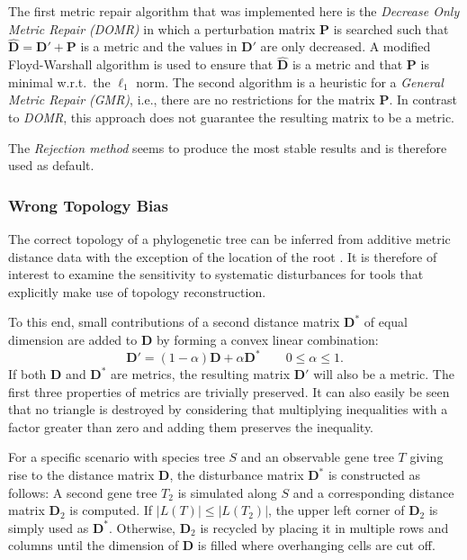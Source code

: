 \documentclass[hidelinks,11pt]{scrreprt}
\begin{document}
The first metric repair algorithm that was implemented here is the \textit{Decrease Only Metric Repair (DOMR)} in which a perturbation matrix $\mathbf{P}$ is searched such that $\mathbf{\hat{D}}=\mathbf{D'}+\mathbf{P}$ is a metric and the values in $\mathbf{D'}$ are only decreased. A modified Floyd-Warshall algorithm is used to ensure that $\mathbf{\hat{D}}$ is a metric and that $\mathbf{P}$ is minimal w.r.t.\ the $\ell_1$ norm. The second algorithm is a heuristic for a \textit{General Metric Repair (GMR)}, i.e., there are no restrictions for the matrix $\mathbf{P}$. In contrast to \emph{DOMR}, this approach does not guarantee the resulting matrix to be a metric.

The \textit{Rejection method} seems to produce the most stable results and is therefore used as default.

\subsubsection{Wrong Topology Bias}
\label{sec:wrong_topology_noise}

The correct topology of a phylogenetic tree can be inferred from additive metric distance data with the exception of the location of the root \citep[][]{bandelt1986,saitou1987}. It is therefore of interest to examine the sensitivity to systematic disturbances for tools that explicitly make use of topology reconstruction.

To this end, small contributions of a second distance matrix $\mathbf{D}^*$ of equal dimension are added to $\mathbf{D}$ by forming a convex linear combination:
\begin{equation}
\mathbf{D'} = (1-\alpha)\mathbf{D} + \alpha \mathbf{D}^* \qquad 0\le \alpha\le 1.
\end{equation}
If both $\mathbf{D}$ and $\mathbf{D}^*$ are metrics, the resulting matrix $\mathbf{D'}$ will also be a metric. The first three properties of metrics are trivially preserved. It can also easily be seen that no triangle is destroyed by considering that multiplying inequalities with a factor greater than zero and adding them preserves the inequality.

For a specific scenario with species tree $S$ and an observable gene tree $T$ giving rise to the distance matrix $\mathbf{D}$, the disturbance matrix $\mathbf{D}^*$ is constructed as follows: A second gene tree $T_2$ is simulated along $S$ and a corresponding distance matrix $\mathbf{D}_2$ is computed. If $|L(T)| \le |L(T_2)|$, the upper left corner of $\mathbf{D}_2$ is simply used as $\mathbf{D}^*$. Otherwise, $\mathbf{D}_2$ is recycled by placing it in multiple rows and columns until the dimension of $\mathbf{D}$ is filled where overhanging cells are cut off. 
\end{document}
